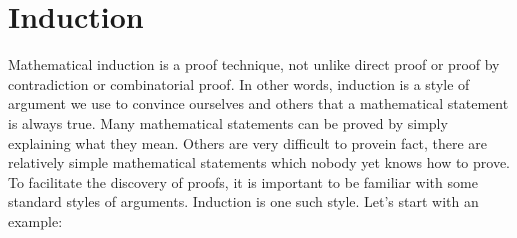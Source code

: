 \documentclass[10pt,]{book}
\theoremstyle{plain}
\theoremstyle{definition}
\theoremstyle{definition}
\theoremstyle{definition}
\numberwithin{equation}{chapter}
\begin{document}
\section[{Induction}]{Induction}\label{sec_background-induction}
\hypertarget{p-2318}{}%
 Mathematical induction is a proof technique, not unlike direct proof or proof by contradiction or combinatorial proof. In other words, induction is a style of argument we use to convince ourselves and others that a mathematical statement is always true. Many mathematical statements can be proved by simply explaining what they mean. Others are very difficult to prove\textemdash{}in fact, there are relatively simple mathematical statements which nobody yet knows how to prove. To facilitate the discovery of proofs, it is important to be familiar with some standard styles of arguments. Induction is one such style. Let's start with an example:%
\typeout{************************************************}
\typeout{************************************************}
\end{document}
